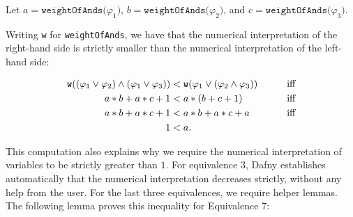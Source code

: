 Let
$a = \texttt{weightOfAnds($\varphi_1$)}$,
$b = \texttt{weightOfAnds($\varphi_2$)}$, and
$c = \texttt{weightOfAnds($\varphi_3$)}$.

\begin{comment}[
\begin{figure}[t!]
\centering
\begin{tikzpicture}[
    tlabel/.style={pos=0.4,right=-1pt},
    baseline=(current bounding box.center),
    level 1/.style={sibling distance=25mm},
    level 2/.style={sibling distance=15mm}    
    ]
	\node [circle, draw]{$\lor$}
		child{node [circle, draw, label = left:{a}]{$\varphi_1$}}
		child{node [circle, draw]{$\land$}
			child{node [circle, draw, label = left:{b}]{$\varphi_2$}}
			child{node [circle, draw, label = left:{c}]{$\varphi_3$}}
		}
;
  \end{tikzpicture}
  $\equiv$ %
  \begin{tikzpicture}[
    tlabel/.style={pos=0.4,right=-1pt},
    baseline=(current bounding box.center),
    level 1/.style={sibling distance=40mm},
    level 2/.style={sibling distance=20mm}
    ]
	\node [circle, draw]{$\land$}
		child{node [circle, draw]{$\lor$}
			child{node [circle, draw, label = left:{a}]{$\varphi_1$}}
			child{node [circle, draw, label = left:{b}]{$\varphi_2$}}
		}
		child{node [circle, draw]{$\lor$}
			child{node [circle, draw, label = left:{a}]{$\varphi_1$}}
			child{node [circle, draw, label = left:{c}]{$\varphi_3$}}
		}
;
  \end{tikzpicture}
\caption{\label{fig:eq3}Equivalence 3}
\end{figure}
\end{comment}

Writing \texttt{w} for \texttt{weightOfAnds}, we have that the
numerical interpretation of the right-hand side is strictly smaller
than the numerical interpretation of the left-hand side:

\begin{align*}
	\texttt{w}((\varphi_1 \lor \varphi_2) \land (\varphi_1 \lor \varphi_3)) &< \texttt{w}(\varphi_1 \lor (\varphi_2 \land \varphi_3)) & \qquad \hfill \mbox{iff} \\
	a * b + a * c + 1  &< a * (b + c + 1) & \qquad \hfill \mbox{iff} \\
	a * b + a * c + 1  &< a * b + a * c + a & \qquad \hfill \mbox{iff} \\
		1 &< a.
\end{align*}

This computation also explains why we require the numerical
interpretation of variables to be strictly greater than $1$. For
equivalence 3, Dafny establishes automatically that the numerical
interpretation decreases strictly, without any help from the user. For
the last three equivalences, we require helper lemmas. The following
lemma proves this inequality for Equivalence 7:

